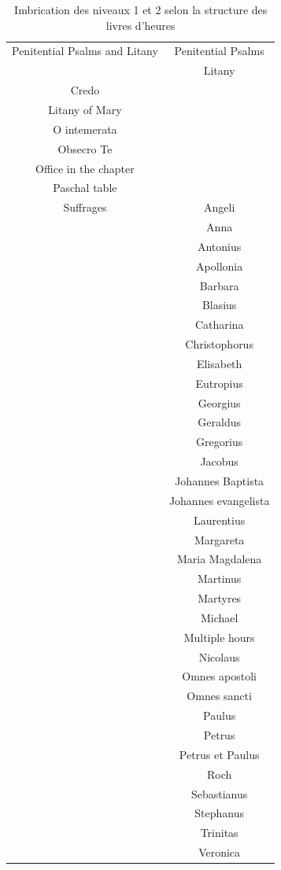 \documentclass[a4paper,12pt,twoside]{book}
\begin{document}
\clearpage
\begin{table}[h!]
\centering
\begin{longtable}{|c|c|}
\hline
Penitential Psalms and Litany & Penitential Psalms \\
& Litany \\ 
\hline
Credo &\\
Litany of Mary &\\
O intemerata &\\
Obsecro Te &\\
Office in the chapter &\\
Paschal table & \\ 
\hline
Suffrages & Angeli \\
& Anna \\
& Antonius \\
& Apollonia \\
& Barbara \\
& Blasius \\
& Catharina \\
& Christophorus \\
& Elisabeth \\
& Eutropius \\
& Georgius \\
& Geraldus \\
& Gregorius \\
& Jacobus \\
& Johannes Baptista \\
& Johannes evangelista \\
& Laurentius \\
& Margareta \\
& Maria Magdalena \\
& Martinus \\
& Martyres \\
& Michael \\
& Multiple hours \\
& Nicolaus \\
& Omnes apostoli \\
& Omnes sancti \\
& Paulus \\
& Petrus \\
& Petrus et Paulus \\
& Roch \\
& Sebastianus \\
& Stephanus \\
& Trinitas \\
& Veronica \\ 
\cline{1-2}
\end{longtable}
\caption{Imbrication des niveaux 1 et 2 selon la structure des livres d'heures}
\end{table} 
\end{document}
